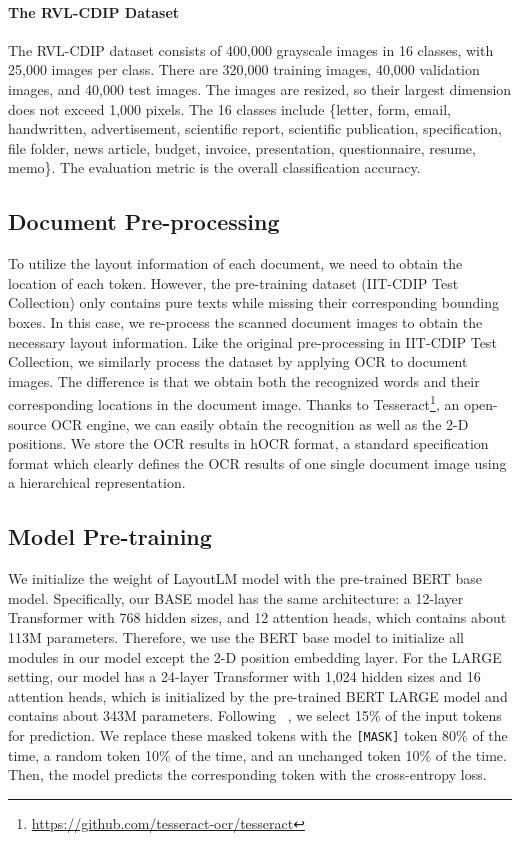 \documentclass[sigconf]{acmart}
\begin{document}
\paragraph{The RVL-CDIP Dataset}

The RVL-CDIP dataset consists of 400,000 grayscale images in 16 classes, with 25,000 images per class. There are 320,000 training images, 40,000 validation images, and 40,000 test images. The images are resized, so their largest dimension does not exceed 1,000 pixels. The 16 classes include \{letter, form, email, handwritten, advertisement, scientific report, scientific publication, specification, file folder, news article, budget, invoice, presentation, questionnaire, resume, memo\}. The evaluation metric is the overall classification accuracy.

\subsection{Document Pre-processing}
To utilize the layout information of each document, we need to obtain the location of each token. However, the pre-training dataset (IIT-CDIP Test Collection) only contains pure texts while missing their corresponding bounding boxes. In this case, we re-process the scanned document images to obtain the necessary layout information. Like the original pre-processing in IIT-CDIP Test Collection, we similarly process the dataset by applying OCR to document images. The difference is that we obtain both the recognized words and their corresponding locations in the document image. Thanks to Tesseract\footnote{\url{https://github.com/tesseract-ocr/tesseract}}, an open-source OCR engine, we can easily obtain the recognition as well as the 2-D positions. We store the OCR results in hOCR format, a standard specification format which clearly defines the OCR results of one single document image using a hierarchical representation.





\subsection{Model Pre-training}
We initialize the weight of LayoutLM model with the pre-trained BERT base model. Specifically, our BASE model has the same architecture: a 12-layer Transformer with 768 hidden sizes, and 12 attention heads, which contains about 113M parameters. Therefore, we use the BERT base model to initialize all modules in our model except the 2-D position embedding layer. For the LARGE setting, our model has a 24-layer Transformer with 1,024 hidden sizes and 16 attention heads, which is initialized by the pre-trained BERT LARGE model and contains about 343M parameters. Following ~\citep{devlin-etal-2019-bert}, we select 15\% of the input tokens for prediction. We replace these masked tokens with the {\tt[MASK]} token 80\% of the time, a random token 10\% of the time, and an unchanged token 10\% of the time. Then, the model predicts the corresponding token with the cross-entropy loss.
\end{document}
